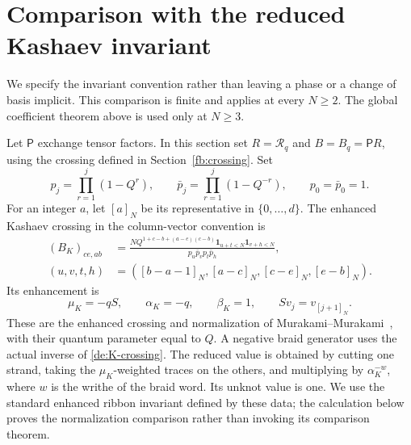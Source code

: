 \section{Comparison with the reduced Kashaev invariant}
\label{de:normalization-section}

We specify the invariant convention rather than leaving a phase or
a change of basis implicit. This comparison is finite and applies
at every \(N\ge2\). The global coefficient theorem above is used
only at \(N\ge3\).

Let \(\mathsf P\) exchange tensor factors. In this section set
\(R=\mathscr R_q\) and \(B=B_q=\mathsf P R\), using the
crossing defined in Section~\ref{fb:crossing}. Set
\[
 p_j=\prod_{r=1}^j(1-Q^r),\qquad
 \bar p_j=\prod_{r=1}^j(1-Q^{-r}),\qquad p_0=\bar p_0=1.
\]
For an integer \(a\), let \([a]_N\) be its representative in
\(\{0,\ldots,d\}\). The enhanced Kashaev crossing in the
column-vector convention is
\begin{equation}\label{de:K-crossing}
 \begin{aligned}
 (B_K)_{ce,ab}&=
 \frac{NQ^{1+c-b+(a-e)(c-b)}
       \mathbf1_{u+t<N}\mathbf1_{v+h<N}}
      {p_u\bar p_vp_t\bar p_h},\\
 (u,v,t,h)&=([b-a-1]_N,[a-c]_N,[c-e]_N,[e-b]_N).
 \end{aligned}
\end{equation}
Its enhancement is
\[
 \mu_K=-qS,\qquad \alpha_K=-q,\qquad \beta_K=1,
 \qquad Sv_j=v_{[j+1]_N}.
\]
These are the enhanced crossing and normalization of
Murakami--Murakami~\cite[\S\S1,4]{MurakamiMurakami2001}, with
their quantum parameter equal to \(Q\).
A negative braid generator uses the actual inverse of
\eqref{de:K-crossing}. The reduced value is obtained by cutting
one strand, taking the \(\mu_K\)-weighted traces on the others,
and multiplying by \(\alpha_K^{-w}\), where \(w\) is the
writhe of the braid word. Its unknot value is one.
We use the standard enhanced ribbon invariant defined by these
data; the calculation below proves the normalization comparison
rather than invoking its comparison theorem.

